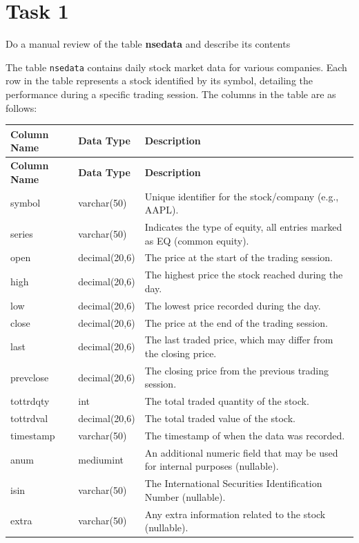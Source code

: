 \documentclass{article}
\begin{document}
\thispagestyle{empty}

\titleBC

\section*{Task 1}

\begin{task*}[1]
Do a manual review of the table \textbf{nsedata} and describe its contents
\end{task*}


The table \texttt{nsedata} contains daily stock market data for various companies. Each row in the table represents a stock identified by its symbol, detailing the performance during a specific trading session. The columns in the table are as follows:

\begin{longtable}{|l|l|l|}
\hline
\textbf{Column Name} & \textbf{Data Type} & \textbf{Description} \\
\hline
\endfirsthead
\hline
\textbf{Column Name} & \textbf{Data Type} & \textbf{Description} \\
\hline
\endhead
symbol & varchar(50) & Unique identifier for the stock/company (e.g., AAPL). \\
series & varchar(50) & Indicates the type of equity, all entries marked as EQ (common equity). \\
open & decimal(20,6) & The price at the start of the trading session. \\
high & decimal(20,6) & The highest price the stock reached during the day. \\
low & decimal(20,6) & The lowest price recorded during the day. \\
close & decimal(20,6) & The price at the end of the trading session. \\
last & decimal(20,6) & The last traded price, which may differ from the closing price. \\
prevclose & decimal(20,6) & The closing price from the previous trading session. \\
tottrdqty & int & The total traded quantity of the stock. \\
tottrdval & decimal(20,6) & The total traded value of the stock. \\
timestamp & varchar(50) & The timestamp of when the data was recorded. \\
anum & mediumint & An additional numeric field that may be used for internal purposes (nullable). \\
isin & varchar(50) & The International Securities Identification Number (nullable). \\
extra & varchar(50) & Any extra information related to the stock (nullable). \\
\hline
\end{longtable}
\end{document}
